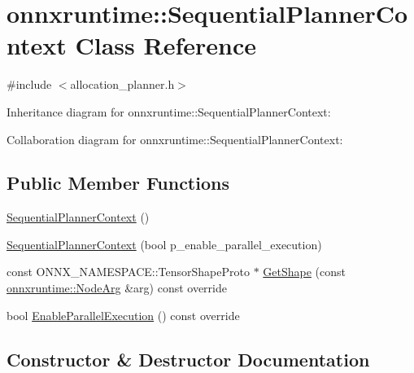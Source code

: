 \hypertarget{classonnxruntime_1_1SequentialPlannerContext}{}\section{onnxruntime\+:\+:Sequential\+Planner\+Context Class Reference}
\label{classonnxruntime_1_1SequentialPlannerContext}


{\ttfamily \#include $<$allocation\+\_\+planner.\+h$>$}



Inheritance diagram for onnxruntime\+:\+:Sequential\+Planner\+Context\+:


Collaboration diagram for onnxruntime\+:\+:Sequential\+Planner\+Context\+:
\subsection*{Public Member Functions}
\begin{DoxyCompactItemize}
\item 
\mbox{\hyperlink{classonnxruntime_1_1SequentialPlannerContext_a280c67eac3da5eb6ef201103b11cc4db}{Sequential\+Planner\+Context}} ()
\item 
\mbox{\hyperlink{classonnxruntime_1_1SequentialPlannerContext_a612b1c70c66e298337656eef820020cc}{Sequential\+Planner\+Context}} (bool p\+\_\+enable\+\_\+parallel\+\_\+execution)
\item 
const O\+N\+N\+X\+\_\+\+N\+A\+M\+E\+S\+P\+A\+C\+E\+::\+Tensor\+Shape\+Proto $\ast$ \mbox{\hyperlink{classonnxruntime_1_1SequentialPlannerContext_a95afd749e2d38675bab0a41b503d575d}{Get\+Shape}} (const \mbox{\hyperlink{classonnxruntime_1_1NodeArg}{onnxruntime\+::\+Node\+Arg}} \&arg) const override
\item 
bool \mbox{\hyperlink{classonnxruntime_1_1SequentialPlannerContext_a3fbcf6cc5bd87b26efcacc2692e93059}{Enable\+Parallel\+Execution}} () const override
\end{DoxyCompactItemize}


\subsection{Constructor \& Destructor Documentation}
\mbox{\label{classonnxruntime_1_1SequentialPlannerContext_a280c67eac3da5eb6ef201103b11cc4db}} 
